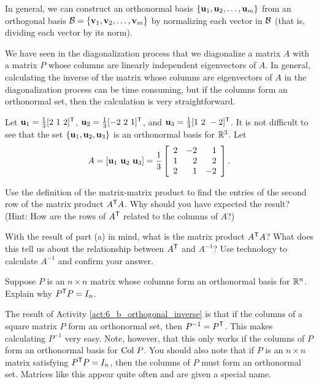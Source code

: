 In general, we can construct an orthonormal basis $\{\mathbf{u}_1, \mathbf{u}_2, \ldots, \mathbf{u}_m\}$ from an orthogonal basis $\mathcal{B} = \{\mathbf{v}_1, \mathbf{v}_2, \ldots, \mathbf{v}_m\}$ by normalizing each vector in $\mathcal{B}$ (that is, dividing each vector by its norm).


\label{sec:orthog_mtx}

We have seen in the diagonalization process that we diagonalize a matrix $A$ with a matrix $P$ whose columns are linearly independent eigenvectors of $A$. In general, calculating the inverse of the matrix whose columns are eigenvectors of $A$ in the diagonalization process can be time consuming, but if the columns form an orthonormal set, then the calculation is very straightforward. 

\begin{activity} \label{act:6_b_orthogonal_inverse}  Let $\mathbf{u}_1 = \frac{1}{3}[2 \ 1 \ 2]^{\mathsf{T}}$, $\mathbf{u}_2 = \frac{1}{3}[-2 \ 2 \ 1]^{\mathsf{T}}$, and $\vu_3 = \frac{1}{3}[1 \ 2 \ -2]^{\tr}$. It is not difficult to see that the set $\{\mathbf{u}_1, \mathbf{u}_2, \mathbf{u}_3\}$ is an orthonormal basis for $\mathbb{R}^3$. Let 
\[A = [\mathbf{u}_1 \ \mathbf{u}_2 \ \mathbf{u}_3] = \frac{1}{3} \left[ \begin{array}{crr} 2&-2&1\\1&2&2\\2&1&-2 \end{array} \right].\] 
\ba
\item Use the definition of the matrix-matrix product to find the entries of the second row of the matrix product $A^{\mathsf{T}}A$. Why should you have expected the result? (Hint: How are the rows of $A^{\mathsf{T}}$ related to the columns of $A$?)

\item With the result of part (a) in mind, what is the matrix product $A^{\mathsf{T}}A$? What does this tell us about the relationship between $A^{\mathsf{T}}$ and $A^{-1}$? Use technology to calculate $A^{-1}$ and confirm your answer.

\item Suppose $P$ is an $n \times n$ matrix whose columns form an orthonormal basis for $\mathbb{R}^n$. Explain why $P^{\mathsf{T}}P = I_n$. 

\ea

\end{activity}

The result of Activity \ref{act:6_b_orthogonal_inverse} is that if the columns of a square matrix $P$ form an orthonormal set, then $P^{-1} = P^{\mathsf{T}}$. This makes calculating $P^{-1}$ very easy. Note, however,  that this only works if the columns of $P$ form an orthonormal basis for $\text{Col } P$. You should also note that if $P$ is an $n \times n$ matrix satisfying $P^{\mathsf{T}}P = I_n$, then the columns of $P$ must form an orthonormal set. Matrices like this appear quite often and are given a special name.

